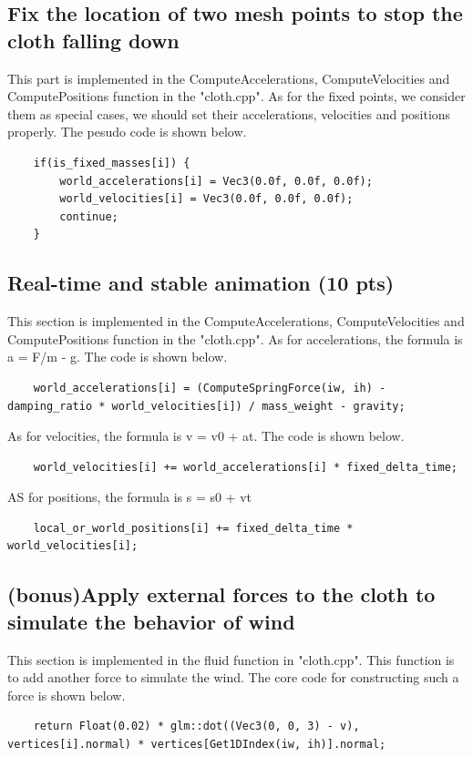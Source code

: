 \documentclass[acmtog]{acmart}
\begin{document}
\subsection{Fix the location of two mesh points to stop the cloth falling down}
\quad This part is implemented in the ComputeAccelerations, ComputeVelocities and ComputePositions function in the "cloth.cpp".
As for the fixed points, we consider them as special cases, we should set their accelerations, velocities and positions properly. 
The pesudo code is shown below.
\begin{lstlisting}
	if(is_fixed_masses[i]) {
		world_accelerations[i] = Vec3(0.0f, 0.0f, 0.0f);
		world_velocities[i] = Vec3(0.0f, 0.0f, 0.0f);
		continue;
	}
\end{lstlisting}
\subsection{Real-time and stable animation (10 pts)}
\quad This section is implemented in the ComputeAccelerations, ComputeVelocities and ComputePositions function in the "cloth.cpp". 
As for accelerations, the formula is a = F/m - g. The code is shown below.
\begin{lstlisting}
	world_accelerations[i] = (ComputeSpringForce(iw, ih) - damping_ratio * world_velocities[i]) / mass_weight - gravity;
\end{lstlisting}
As for velocities, the formula is v = v0 + at. The code is shown below.
\begin{lstlisting}
	world_velocities[i] += world_accelerations[i] * fixed_delta_time;
\end{lstlisting}
AS for positions, the formula is s = s0 + vt
\begin{lstlisting}
	local_or_world_positions[i] += fixed_delta_time * world_velocities[i];
\end{lstlisting}
\subsection{(bonus)Apply external forces to the cloth to simulate the behavior of wind}
\quad This section is implemented in the fluid function in "cloth.cpp". This function is to add another force to simulate the wind.
The core code for constructing such a force is shown below.
\begin{lstlisting}
	return Float(0.02) * glm::dot((Vec3(0, 0, 3) - v), vertices[i].normal) * vertices[Get1DIndex(iw, ih)].normal;
\end{lstlisting}
\end{document}
